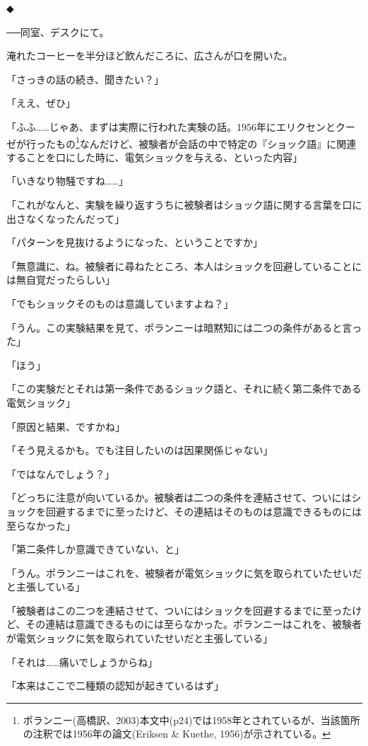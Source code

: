 \documentclass[paper=b5j]{jlreq}
\begin{document}
◆

──同室、デスクにて。

淹れたコーヒーを半分ほど飲んだころに、広さんが口を開いた。

「さっきの話の続き、聞きたい？」

「ええ、ぜひ」

「ふふ……じゃあ、まずは実際に行われた実験の話。1956年にエリクセンとクーゼが行ったもの\footnote{ポランニー(高橋訳、2003)本文中(p24)では1958年とされているが、当該箇所の注釈では1956年の論文(Eriksen \& Kuethe, 1956)が示されている。}\cite{eriksen1956}なんだけど、被験者が会話の中で特定の『ショック語』に関連することを口にした時に、電気ショックを与える、といった内容」

「いきなり物騒ですね……」

「これがなんと、実験を繰り返すうちに被験者はショック語に関する言葉を口に出さなくなったんだって」

「パターンを見抜けるようになった、ということですか」

「無意識に、ね。被験者に尋ねたところ、本人はショックを回避していることには無自覚だったらしい」

「でもショックそのものは意識していますよね？」

「うん。この実験結果を見て、ポランニーは暗黙知には二つの条件があると言った」

「ほう」

「この実験だとそれは第一条件であるショック語と、それに続く第二条件である電気ショック」

「原因と結果、ですかね」

「そう見えるかも。でも注目したいのは因果関係じゃない」

「ではなんでしょう？」

「どっちに注意が向いているか。被験者は二つの条件を連結させて、ついにはショックを回避するまでに至ったけど、その連結はそのものは意識できるものには至らなかった」

「第二条件しか意識できていない、と」

「うん。ポランニーはこれを、被験者が電気ショックに気を取られていたせいだと主張している\cite[26]{polanyi1966ja}」

「被験者はこの二つを連結させて、ついにはショックを回避するまでに至ったけど、その連結は意識できるものには至らなかった。ポランニーはこれを、被験者が電気ショックに気を取られていたせいだと主張している\cite[26]{polanyi1966ja}」

「それは……痛いでしょうからね」

「本来はここで二種類の認知が起きているはず」
\end{document}
